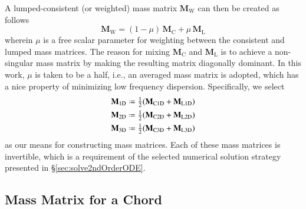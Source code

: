A lumped-consistent (or weighted) mass matrix $\mathbf{M}_{\mathrm{W}}$ can then be created as follows
\begin{equation*}
\mathbf{M}_\mathrm{W}  = (1 - \mu) \, \mathbf{M}_{\mathrm{C}} + \mu \, \mathbf{M}_{\mathrm{L}}
\end{equation*}
wherein $\mu$ is a free scalar parameter for weighting between the consistent and lumped mass matrices.  The reason for mixing $\mathbf{M}_{\mathrm{C}}$ and $\mathbf{M}_{\mathrm{L}}$ is to achieve a non-singular mass matrix by making the resulting matrix diagonally dominant.  In this work, $\mu$ is taken to be a half, i.e., an averaged mass matrix is adopted, which has a nice property of minimizing low frequency dispersion.  Specifically, we select
\begin{subequations}
    \label{LumconsMass}
    \begin{align}
    \mathbf{M}_{\mathrm{1D}} & \defeq \tfrac{1}{2} (\mathbf{M}_{\mathrm{C1D}} + \mathbf{M}_{\mathrm{L1D}}) \\
    \mathbf{M}_{\mathrm{2D}} & \defeq \tfrac{1}{2} (\mathbf{M}_{\mathrm{C2D}} + \mathbf{M}_{\mathrm{L2D}}) \\
    \mathbf{M}_{\mathrm{3D}} & \defeq \tfrac{1}{2} (\mathbf{M}_{\mathrm{C3D}} + \mathbf{M}_{\mathrm{L3D}})
    \end{align}
\end{subequations}
as our means for constructing mass matrices.  Each of these mass matrices is invertible, which is a requirement of the selected numerical solution strategy presented in \S\ref{sec:solve2ndOrderODE}.

\subsection{Mass Matrix for a Chord}

